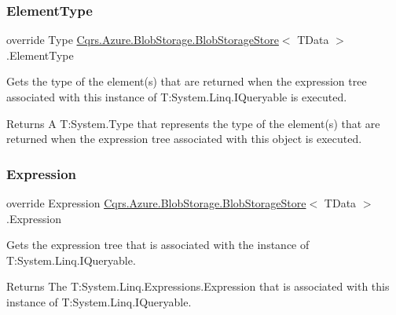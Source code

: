 \subsubsection{\texorpdfstring{Element\+Type}{ElementType}}
{\footnotesize\ttfamily override Type \hyperlink{classCqrs_1_1Azure_1_1BlobStorage_1_1BlobStorageStore}{Cqrs.\+Azure.\+Blob\+Storage.\+Blob\+Storage\+Store}$<$ T\+Data $>$.Element\+Type\hspace{0.3cm}{\ttfamily [get]}}



Gets the type of the element(s) that are returned when the expression tree associated with this instance of T\+:\+System.\+Linq.\+I\+Queryable is executed. 

\begin{DoxyReturn}{Returns}
A T\+:\+System.\+Type that represents the type of the element(s) that are returned when the expression tree associated with this object is executed. 
\end{DoxyReturn}
\mbox{\label{classCqrs_1_1Azure_1_1BlobStorage_1_1BlobStorageStore_a8b3be7237234e7de532fccbfa6bbade8}} 
\subsubsection{\texorpdfstring{Expression}{Expression}}
{\footnotesize\ttfamily override Expression \hyperlink{classCqrs_1_1Azure_1_1BlobStorage_1_1BlobStorageStore}{Cqrs.\+Azure.\+Blob\+Storage.\+Blob\+Storage\+Store}$<$ T\+Data $>$.Expression\hspace{0.3cm}{\ttfamily [get]}}



Gets the expression tree that is associated with the instance of T\+:\+System.\+Linq.\+I\+Queryable. 

\begin{DoxyReturn}{Returns}
The T\+:\+System.\+Linq.\+Expressions.\+Expression that is associated with this instance of T\+:\+System.\+Linq.\+I\+Queryable. 
\end{DoxyReturn}
\mbox{\label{classCqrs_1_1Azure_1_1BlobStorage_1_1BlobStorageStore_acbc7f5a9d6eb9d1ece9a9035f185d4bf}} 
